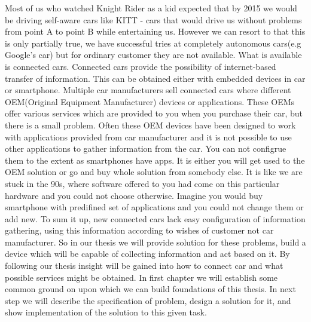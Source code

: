 Most of us who watched Knight Rider as a kid expected that by 2015 we would be driving self-aware cars like KITT - cars that would drive us without problems from point A to point B while entertaining us. However we can resort to that this is only partially true, we have successful tries at completely autonomous cars(e.g Google’s car) but for ordinary customer they are not available. What is available is connected cars. Connected cars provide the possibility of internet-based transfer of information. This can be obtained either with embedded devices in car or smartphone. Multiple car manufacturers sell connected cars where different OEM(Original Equipment Manufacturer) devices or applications. These OEMs offer various services which are provided to you when you purchase their car, but there is a small problem. Often these OEM devices have been designed to work with applications provided from car manufacturer and it is not possible to use other applications to gather information from the car. You can not configrue them to the extent as smartphones have apps. It is either you will get used to the OEM solution or go and buy whole solution from somebody else. It is like we are stuck in the 90s, where software offered to you had come on this particular hardware and you could not choose otherwise.  Imagine you would buy smartphone with predifined set of applications and you could not change them or add new. To sum it up, new connected cars lack easy configuration of information gathering, using this information according to wishes of customer not car manufacturer. So in our thesis we will provide solution for these problems, build a device which will be capable of collecting information and act based on it. By following our thesis insight will be gained into how to connect car and what possible services might be obtained. In first chapter we will establish some common ground on upon which we can build foundations of this thesis. In next step we will describe the specification of problem, design a solution for it, and show implementation of the solution to this given task.